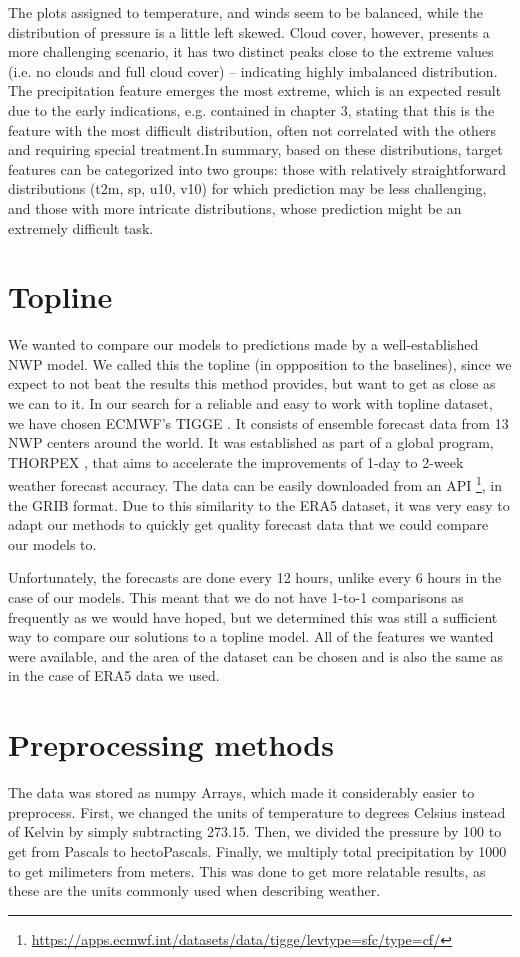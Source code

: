 The plots assigned to temperature, and winds seem to be balanced, while the distribution of pressure is a little left skewed. Cloud cover, however, presents a more challenging scenario, it has two distinct peaks close to the extreme values (i.e. no clouds and full cloud cover) -- indicating highly imbalanced distribution. The precipitation feature emerges the most extreme, which is an expected result due to the early indications, e.g. contained in chapter 3, stating that this is the feature with the most difficult distribution, often not correlated with the others and requiring special treatment.In summary, based on these distributions, target features can be categorized into two groups: those with relatively straightforward distributions (t2m, sp, u10, v10) for which prediction may be less challenging, and those with more intricate distributions, whose prediction might be an extremely difficult task. 


\section{Topline}
We wanted to compare our models to predictions made by a well-established NWP model. We called this the topline (in oppposition to the baselines), since we expect to not beat the results this method provides, but want to get as close as we can to it.
In our search for a reliable and easy to work with topline dataset, we have chosen ECMWF's TIGGE \cite{tigge}. It consists of ensemble forecast data from 13 NWP centers around the world. It was established as part of a global program, THORPEX \cite{bougeault2010thorpex}, that aims to accelerate the improvements of 1-day to 2-week weather forecast accuracy. The data can be easily downloaded from an API \footnote{\url{https://apps.ecmwf.int/datasets/data/tigge/levtype=sfc/type=cf/}}, in the GRIB format. Due to this similarity to the ERA5 dataset, it was very easy to adapt our methods to quickly get quality forecast data that we could compare our models to.

Unfortunately, the forecasts are done every 12 hours, unlike every 6 hours in the case of our models. This meant that we do not have 1-to-1 comparisons as frequently as we would have hoped, but we determined this was still a sufficient way to compare our solutions to a topline model. All of the features we wanted were available, and the area of the dataset can be chosen and is also the same as in the case of ERA5 data we used.

\section{Preprocessing methods}\label{chap:preprocesing}
The data was stored as numpy \cite{harris2020array} Arrays, which made it considerably easier to preprocess. First, we changed the units of temperature to degrees Celsius instead of Kelvin by simply subtracting 273.15. Then, we divided the pressure by 100 to get from Pascals to hectoPascals. Finally, we multiply total precipitation by 1000 to get milimeters from meters. This was done to get more relatable results, as these are the units commonly used when describing weather.

